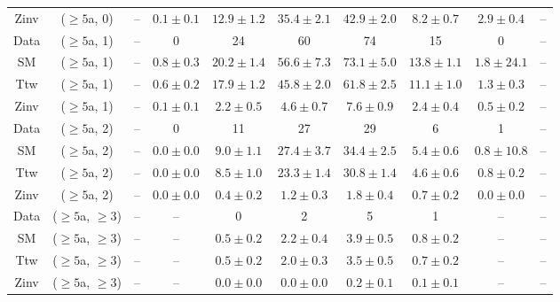 \begin{table}[h!]
{\begin{tabular}{cccccccccc}
	Zinv & ($\ge5$a, 0) & -- & $0.1\pm 0.1$ & $12.9\pm 1.2$ & $35.4\pm 2.1$ & $42.9\pm 2.0$ & $8.2\pm 0.7$ & $2.9\pm 0.4$ & -- \\[0.5ex] 
	Data & ($\ge5$a, 1) & -- & 0 & 24 & 60 & 74 & 15 & 0 & -- \\[0.5ex] 
	SM & ($\ge5$a, 1) & -- & $0.8\pm 0.3$ & $20.2\pm 1.4$ & $56.6\pm 7.3$ & $73.1\pm 5.0$ & $13.8\pm 1.1$ & $1.8\pm 24.1$ & -- \\[0.5ex] 
	Ttw & ($\ge5$a, 1) & -- & $0.6\pm 0.2$ & $17.9\pm 1.2$ & $45.8\pm 2.0$ & $61.8\pm 2.5$ & $11.1\pm 1.0$ & $1.3\pm 0.3$ & -- \\[0.5ex] 
	Zinv & ($\ge5$a, 1) & -- & $0.1\pm 0.1$ & $2.2\pm 0.5$ & $4.6\pm 0.7$ & $7.6\pm 0.9$ & $2.4\pm 0.4$ & $0.5\pm 0.2$ & -- \\[0.5ex] 
	Data & ($\ge5$a, 2) & -- & 0 & 11 & 27 & 29 & 6 & 1 & -- \\[0.5ex] 
	SM & ($\ge5$a, 2) & -- & $0.0\pm 0.0$ & $9.0\pm 1.1$ & $27.4\pm 3.7$ & $34.4\pm 2.5$ & $5.4\pm 0.6$ & $0.8\pm 10.8$ & -- \\[0.5ex] 
	Ttw & ($\ge5$a, 2) & -- & $0.0\pm 0.0$ & $8.5\pm 1.0$ & $23.3\pm 1.4$ & $30.8\pm 1.4$ & $4.6\pm 0.6$ & $0.8\pm 0.2$ & -- \\[0.5ex] 
	Zinv & ($\ge5$a, 2) & -- & $0.0\pm 0.0$ & $0.4\pm 0.2$ & $1.2\pm 0.3$ & $1.8\pm 0.4$ & $0.7\pm 0.2$ & $0.0\pm 0.0$ & -- \\[0.5ex] 
	Data & ($\ge5$a, $\ge3$) & -- & -- & 0 & 2 & 5 & 1 & -- & -- \\[0.5ex] 
	SM & ($\ge5$a, $\ge3$) & -- & -- & $0.5\pm 0.2$ & $2.2\pm 0.4$ & $3.9\pm 0.5$ & $0.8\pm 0.2$ & -- & -- \\[0.5ex] 
	Ttw & ($\ge5$a, $\ge3$) & -- & -- & $0.5\pm 0.2$ & $2.0\pm 0.3$ & $3.5\pm 0.5$ & $0.7\pm 0.2$ & -- & -- \\[0.5ex] 
	Zinv & ($\ge5$a, $\ge3$) & -- & -- & $0.0\pm 0.0$ & $0.0\pm 0.0$ & $0.2\pm 0.1$ & $0.1\pm 0.1$ & -- & -- \\[0.5ex] 
	\hline
	\hline
\end{tabular}}
\end{table}
